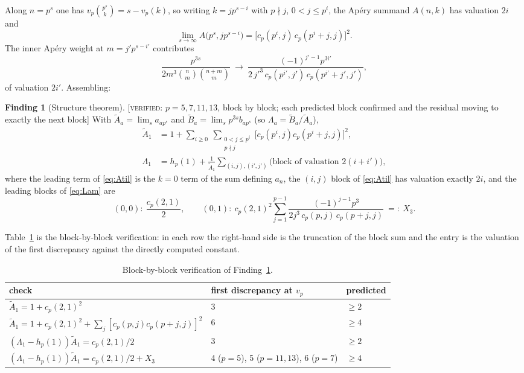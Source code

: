 \documentclass[11pt,reqno]{article}
\newcommand{\Atil}{\widetilde{A}}
\newcommand{\Btil}{\widetilde{B}}
\newcommand{\vp}{v_p}
\newcommand{\bin}[2]{\binom{#1}{#2}}
\newcommand{\VER}[1]{{\normalfont\textsc{[verified:} #1\textsc{]}}}
\theoremstyle{plain}
\theoremstyle{definition}
\newtheorem{finding}[theorem]{Finding}
\theoremstyle{remark}
\numberwithin{equation}{section}
\begin{document}
Along $n=p^s$ one has $\vp\bin{p^s}{k}=s-\vp(k)$, so writing $k=jp^{s-i}$ with
$p\nmid j$, $0<j\le p^{i}$, the Ap\'ery summand $A(n,k)$ has valuation $2i$ and
\[
  \lim_{s\to\infty}A\bigl(p^s,jp^{s-i}\bigr)
  =\bigl[c_p(p^{i},j)\,c_p(p^{i}+j,j)\bigr]^2 .
\]
The inner Ap\'ery weight at $m=j'p^{s-i'}$ contributes
\[
  \frac{p^{3s}}{2m^3\bin{n}{m}\bin{n+m}{m}}
  \ \longrightarrow\
  \frac{(-1)^{j'-1}p^{3i'}}{2\,j'^{3}\,c_p(p^{i'},j')\,c_p(p^{i'}+j',j')},
\]
of valuation $2i'$.  Assembling:

\begin{finding}[Structure theorem]\label{find:structure}
\VER{$p=5,7,11,13$, block by block; each predicted block confirmed and the
residual moving to exactly the next block}  With
$\Atil_a=\lim_sa_{ap^s}$ and $\Btil_a=\lim_sp^{3s}b_{ap^s}$ (so
$\Lambda_a=\Btil_a/\Atil_a$),
\begin{align}
  \Atil_1&=1+\sum_{i\ge0}\ \sum_{\substack{0<j\le p^{i}\\ p\nmid j}}
    \bigl[c_p(p^{i},j)c_p(p^{i}+j,j)\bigr]^2,
    \label{eq:Atil}\\
  \Lambda_1&=h_p(1)+\frac{1}{\Atil_1}
    \sum_{(i,j),(i',j')}\bigl(\text{block of valuation }2(i+i')\bigr),
    \label{eq:Lam}
\end{align}
where the leading term of \eqref{eq:Atil} is the $k=0$ term of the sum defining
$a_n$, the $(i,j)$ block of \eqref{eq:Atil} has valuation exactly $2i$, and the
leading blocks of \eqref{eq:Lam} are
\[
  (0,0):\ \frac{c_p(2,1)}{2},
  \qquad
  (0,1):\ c_p(2,1)^2\sum_{j=1}^{p-1}
     \frac{(-1)^{j-1}p^3}{2j^3\,c_p(p,j)\,c_p(p+j,j)} \ =:\ X_3 .
\]
\end{finding}

Table~\ref{tab:blocks} is the block-by-block verification: in each row the
right-hand side is the truncation of the block sum and the entry is the
valuation of the first discrepancy against the directly computed constant.

\begin{table}[h]
\centering\small
\caption{Block-by-block verification of Finding~\ref{find:structure}.}
\label{tab:blocks}
\begin{tabular}{@{}lll@{}}
\toprule
check & first discrepancy at $\vp$ & predicted\\
\midrule
$\Atil_1=1+c_p(2,1)^2$ & 3 & $\ge2$\\
$\Atil_1=1+c_p(2,1)^2+\sum_j[c_p(p,j)c_p(p+j,j)]^2$ & 6 & $\ge4$\\
$(\Lambda_1-h_p(1))\Atil_1=c_p(2,1)/2$ & 3 & $\ge2$\\
$(\Lambda_1-h_p(1))\Atil_1=c_p(2,1)/2+X_3$ & 4 ($p=5$), 5 ($p=11,13$), 6 ($p=7$) & $\ge4$\\
\bottomrule
\end{tabular}
\end{table}
\end{document}
